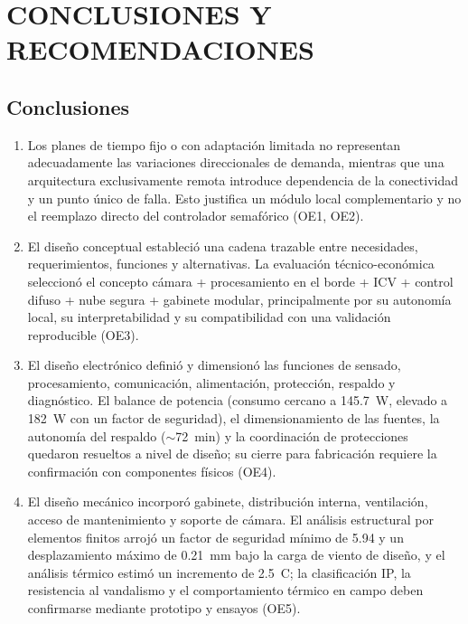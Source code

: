 \chapter*{CONCLUSIONES Y RECOMENDACIONES}
\label{cap:conclusiones}

\section*{Conclusiones}

\begin{enumerate}
\item Los planes de tiempo fijo o con
adaptación limitada no representan adecuadamente las variaciones direccionales de demanda, mientras que una
arquitectura exclusivamente remota introduce dependencia de la conectividad y un punto único de falla. Esto
justifica un módulo local complementario y no el reemplazo directo del controlador semafórico (OE1, OE2).

\item El diseño conceptual estableció una cadena trazable entre necesidades, requerimientos, funciones y
alternativas. La evaluación técnico-económica seleccionó el concepto cámara + procesamiento en el borde +
ICV + control difuso + nube segura + gabinete modular, principalmente por su autonomía local, su
interpretabilidad y su compatibilidad con una validación reproducible (OE3).

\item El diseño electrónico definió y dimensionó las funciones de sensado, procesamiento, comunicación,
alimentación, protección, respaldo y diagnóstico. El balance de potencia (consumo cercano a 145.7~W,
elevado a 182~W con un factor de seguridad), el dimensionamiento de las fuentes, la autonomía del
respaldo ($\sim$72~min) y la coordinación de protecciones quedaron resueltos a nivel de diseño; su cierre
para fabricación requiere la confirmación con componentes físicos (OE4).

\item El diseño mecánico incorporó gabinete, distribución interna, ventilación, acceso de mantenimiento y
soporte de cámara. El análisis estructural por elementos finitos arrojó un factor de seguridad mínimo de
5.94 y un desplazamiento máximo de 0.21~mm bajo la carga de viento de diseño, y el análisis térmico estimó
un incremento de 2.5~\textdegree C; la clasificación IP, la resistencia al vandalismo y el comportamiento
térmico en campo deben confirmarse mediante prototipo y ensayos (OE5).


\end{enumerate}
